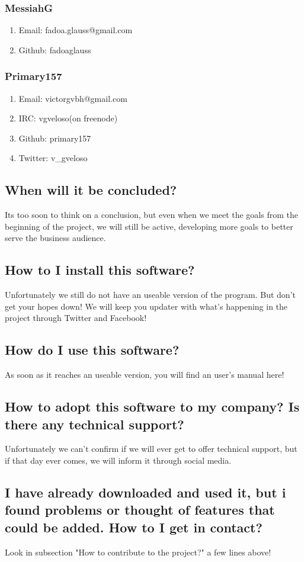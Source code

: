 \documentclass[a4paper,12pt]{article}
\begin{document}
			\subsubsection{MessiahG}
			\begin{enumerate}
				\item Email: fadoa.glauss@gmail.com
				\item Github: fadoaglauss
			\end{enumerate}
			\subsubsection{Primary157}
			\begin{enumerate}
				\item Email: victorgvbh@gmail.com
				\item IRC: vgveloso(on freenode)
				\item Github: primary157
				\item Twitter: v\_gveloso
			\end{enumerate}
		\subsection{When will it be concluded?}
			Its too soon to think on a conclusion, but even when we meet the goals from the beginning of the project, we will still be active, developing more goals to better serve the business audience.
		\subsection{How to I install this software?}
			Unfortunately we still do not have an useable version of the program. But don't get your hopes down! We will keep you updater with what's happening in the project through Twitter and Facebook!
		\subsection{How do I use this software?}
			As soon as it reaches an useable version, you will find an user's manual here!
		\subsection{How to adopt this software to my company? Is there any technical support?}
			Unfortunately we can't confirm if we will ever get to offer technical support, but if that day ever comes, we will inform it through social media.
		\subsection{I have already downloaded and used it, but i found problems or thought of features that could be added. How to I get in contact?}
			Look in subsection "How to contribute to the project?" a few lines above!
\end{document}
